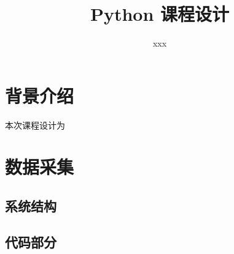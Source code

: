 \documentclass[UTF8]{article}
\title{Python 课程设计}
\author{xxx}
\date{}
\begin{document}
\maketitle

\section{背景介绍}
本次课程设计为
\section{数据采集}
\subsection{系统结构}


\subsection{代码部分}
\end{document}
